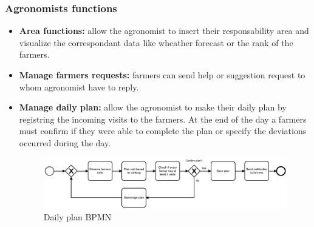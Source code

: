 \documentclass[table, 12pt]{article}
\begin{document}
\subsubsection{Agronomists functions}
\begin{itemize}
    \item \textbf{Area functions: }allow the agronomist to insert their responsability area and visualize the correspondant data like wheather forecast or the rank of the farmers.
    \item \textbf{Manage farmers requests: }farmers can send help or suggestion request to whom agronomist have to reply.
    \item \textbf{Manage daily plan: }allow the agronomist to make their daily plan by registring the incoming visits to the farmers. At the end of the day a farmers must confirm if they were able to complete the plan or specify the deviations occurred during the day.   
    \begin{center}
        \begin{figure}[!h]
            \includegraphics[width=\textwidth]{assets/BPMN/DailyPlanBpmn}
            \caption{Daily plan BPMN}
            \label{fig: dailyplan}
        \end{figure}
    \end{center}
\end{itemize}
\end{document}

